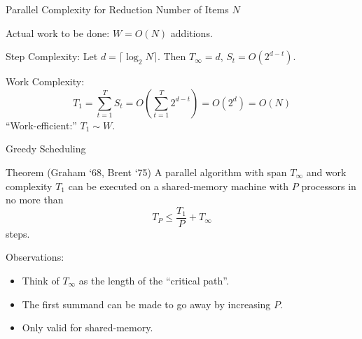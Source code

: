 \documentclass[english,compress]{beamer}
\begin{document}
\begin{frame}{Parallel Complexity for Reduction}
  Number of Items $N$

  Actual work to be done: $W=O(N)$ additions.

  \medskip
  Step Complexity: Let $d=\lceil \log_2 N\rceil$.
  Then $T_\infty=d$, $S_t=O(2^{d-t})$.

  \medskip
  Work Complexity:
  \[
    T_1 = \sum_{t=1}^T S_t = O\left(\sum_{t=1}^T 2^{d-t}\right)
    = O(2^d)=O(N)
  \]
  \pause
  ``Work-efficient:'' $T_1 \sim W$.
\end{frame}
\begin{frame}{Greedy Scheduling}
  \begin{block}{Theorem (Graham `68, Brent `75)}
  A parallel algorithm with span $T_\infty$ and work complexity
  $T_1$ can be executed on a shared-memory machine with $P$ processors
  in no more than
  \[
    T_P \le \frac {T_1}P+T_\infty
  \]
  steps.
  \end{block}
  \bigskip
  Observations:
  \begin{itemize}
    \item Think of $T_\infty$ as the length of the ``critical path''.
    \item The first summand can be made to go away by increasing $P$.
    \item Only valid for shared-memory.
  \end{itemize}
\end{frame}
\end{document}
